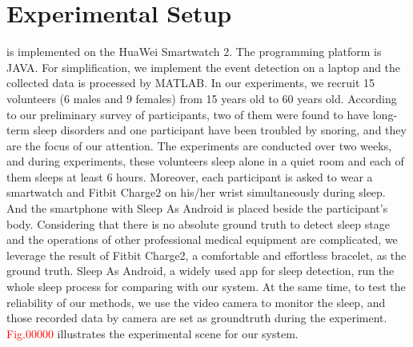 \section{Experimental Setup}
{\systemname} is implemented on the HuaWei Smartwatch 2. The programming platform is JAVA. For simplification, we implement the event detection on a laptop and the collected data is processed by MATLAB. In our experiments, we recruit 15 volunteers (6 males and 9 females) from 15 years old to 60 years old. According to our preliminary survey of participants, two of them were found to have long-term sleep disorders and  one participant have been troubled by snoring, and they are the focus of our attention. The experiments are conducted over two weeks, and during experiments, these volunteers sleep alone in a quiet room and each of them sleeps at least 6 hours. Moreover, each participant is asked to wear a smartwatch and Fitbit Charge2 \cite{fitbit} on his/her wrist simultaneously during sleep. And the smartphone with Sleep As Android \cite{SleepAndroid} is placed beside the participant's body. Considering that there is no absolute ground truth to detect sleep stage and the operations of other professional medical equipment are complicated, we leverage the result of Fitbit Charge2, a comfortable and effortless bracelet, as the ground truth. Sleep As Android, a widely used app for sleep detection, run the whole sleep process for comparing with our system. At the same time, to test the reliability of our methods, we use the video camera to monitor the sleep, and those recorded data by camera are set as groundtruth during the experiment. \textcolor{red}{Fig.00000} illustrates the experimental scene for our system.


